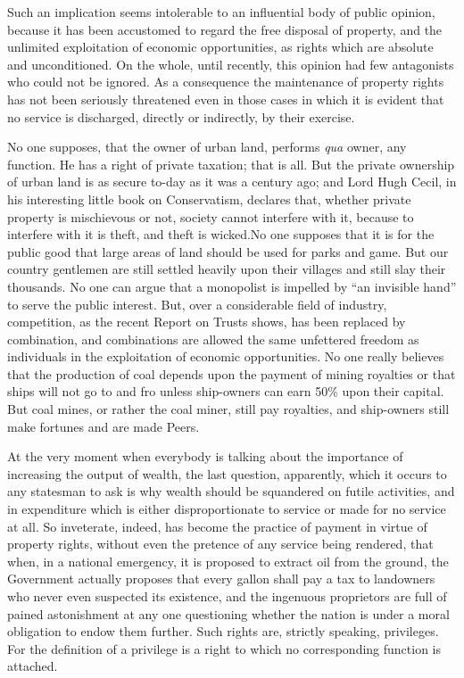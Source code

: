 \documentclass{book}
\begin{document}
Such an implication seems intolerable to an influential body of public opinion, because it has been accustomed to regard the free disposal of property, and the unlimited exploitation of economic opportunities, as rights which are absolute and unconditioned. On the whole, until recently, this opinion had few antagonists who could not be ignored. As a consequence the maintenance of property rights has not been seriously threatened even in those cases in which it is evident that no service is discharged, directly or indirectly, by their exercise.

No one supposes, that the owner of urban land, performs \emph{qua} owner, any function. He has a right of private taxation; that is all. But the private ownership of urban land is as secure to-day as it was a century ago; and Lord Hugh Cecil, in his interesting little book on Conservatism, declares that, whether private property is mischievous or not, society cannot interfere with it, because to interfere with it is theft, and theft is wicked.\footnotemark[1] No one supposes that it is for the public good that large areas of land should be used for parks and game. But our country gentlemen are still settled heavily upon their villages and still slay their thousands. No one can argue that a monopolist is impelled by “an invisible hand” to serve the public interest. But, over a considerable field of industry, competition, as the recent Report on Trusts shows, has been replaced by combination, and combinations are allowed the same unfettered freedom as individuals in the exploitation of economic opportunities. No one really believes that the production of coal depends upon the payment of mining royalties or that ships will not go to and fro unless ship-owners can earn 50\% upon their capital. But coal mines, or rather the coal miner, still pay royalties, and ship-owners still make fortunes and are made Peers.

At the very moment when everybody is talking about the importance of increasing the output of wealth, the last question, apparently, which it occurs to any statesman to ask is why wealth should be squandered on futile activities, and in expenditure which is either disproportionate to service or made for no service at all. So inveterate, indeed, has become the practice of payment in virtue of property rights, without even the pretence of any service being rendered, that when, in a national emergency, it is proposed to extract oil from the ground, the Government actually proposes that every gallon shall pay a tax to landowners who never even suspected its existence, and the ingenuous proprietors are full of pained astonishment at any one questioning whether the nation is under a moral obligation to endow them further. Such rights are, strictly speaking, privileges. For the definition of a privilege is a right to which no corresponding function is attached.
\end{document}
